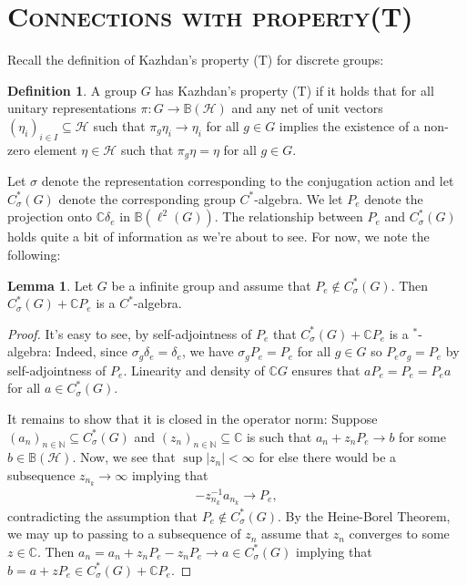 \documentclass[10pt,oneside,openany,final]{memoir}
\newcommand{\ssection}[1]{%
\newpage%
\section[#1]{\centering\normalfont\scshape \textbf{#1}}}
\theoremstyle{definition}
\newtheorem{lemma}[theorem]{Lemma}
\newtheorem{definition}[theorem]{Definition}
\theoremstyle{Break}
\newcommand{\C}{\mathbb{C}}
\newcommand{\N}{\mathbb{N}}
\newcommand{\B}{\mathbb{B}}
\renewcommand{\H}{\mathcal{H}}
\begin{document}
\ssection{Connections with property(T)}
Recall the definition of Kazhdan's property (T) for discrete groups:
\begin{definition}
	A group $G$ has Kazhdan's property (T) if it holds that for all unitary representations $\pi \colon G \to \mathbb{B}(\H)$ and any net of unit vectors $(\eta_i)_{i \in I} \subseteq \H$ such that $\pi_g \eta_i \to \eta_i$ for all $g \in G$ implies the existence of a non-zero element $\eta \in \H$ such that $\pi_g \eta = \eta$ for all $g \in G$.
\end{definition}
Let $\sigma$ denote the representation corresponding to the conjugation action and let $C_\sigma^* (G)$ denote the corresponding group $C^*$-algebra. We let $P_e$ denote the projection onto $\C \delta_e$ in $\mathbb{B}(\ell^2(G))$. The relationship between $P_e$ and $C_\sigma^*(G)$ holds quite a bit of information as we're about to see. For now, we note the following:
\begin{lemma}
	Let $G$ be a infinite group and assume that $P_e \not\in C_\sigma^*(G)$. Then $C_\sigma^*(G)+\C P_e$ is a $C^*$-algebra.
\end{lemma}
\begin{proof}
	It's easy to see, by self-adjointness of $P_e$ that $C_\sigma^*(G)+\C P_e$ is a $^*$-algebra: Indeed, since $\sigma_g \delta_e=\delta_e$, we have $\sigma_g P_e=P_e$ for all $g \in G$ so $P_e \sigma_g=P_e$ by self-adjointness of $P_e$. Linearity and density of $\C G$ ensures that $aP_e=P_e=P_ea$ for all $a \in C_\sigma^*(G)$.
	
	It remains to show that it is closed in the operator norm: Suppose $(a_n)_{n \in \N}\subseteq C_\sigma^*(G)$ and $(z_n)_{n \in \N}\subseteq \C$ is such that $a_n+z_nP_e \to b$ for some $b \in \B(\H)$. Now, we see that $\sup|z_n| < \infty$ for else there would be a subsequence $z_{n_k} \to \infty$ implying that
	\begin{align*}
		-z_{n_k}^{-1}a_{n_k}  \to P_e,
	\end{align*}
	contradicting the assumption that $P_e \not \in C_\sigma^*(G)$. By the Heine-Borel Theorem, we may up to passing to a subsequence of $z_{n}$ assume that $z_n$ converges to some $z \in \C$. Then $a_n=a_n+z_n P_e - z_nP_e \to a \in C_\sigma^*(G)$ implying that $b=a+zP_e \in C_\sigma^*(G)+\C P_e$.
\end{proof}
\end{document}
